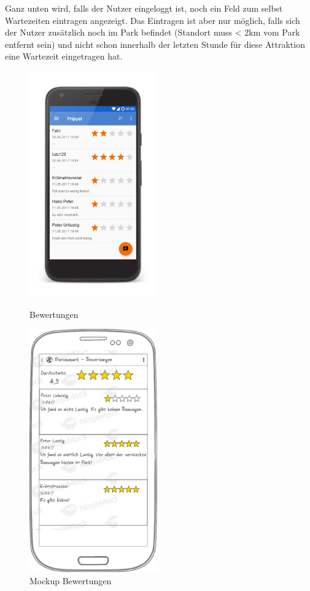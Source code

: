 Ganz unten wird, falls der Nutzer eingeloggt ist, noch ein Feld zum selbst Wartezeiten eintragen angezeigt. Das Eintragen ist aber nur möglich, falls sich der Nutzer zusätzlich noch im Park befindet (Standort muss < 2km vom Park entfernt sein) und nicht schon innerhalb der letzten Stunde für diese Attraktion eine Wartezeit eingetragen hat. 

\begin{figure}[h]
    \centering
    \begin{minipage}{0.49\textwidth}
        \centering
        \includegraphics[width=0.49\textwidth, trim=150 200 200 200, 
        clip]{img/screenshots/ss_bewertungen.png}
        \caption{Bewertungen}
		\label{figure:implementierungbewertungen}
    \end{minipage}
    \begin{minipage}{0.49\textwidth}
        \centering
        \includegraphics[width=0.49\textwidth]{img/mockups/m_park_bewertungen.png}
        \caption{Mockup Bewertungen}
    \end{minipage}
\end{figure}

